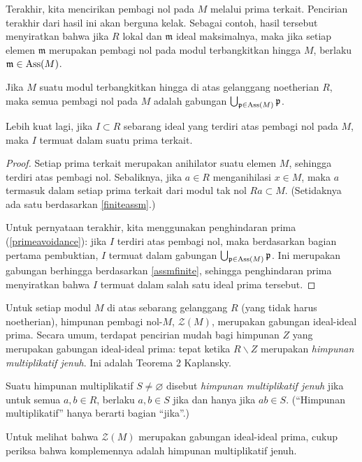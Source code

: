 Terakhir, kita mencirikan pembagi nol pada $M$ melalui prima terkait.
Pencirian terakhir dari hasil ini akan berguna kelak.
Sebagai contoh, hasil tersebut menyiratkan bahwa jika $R$ lokal dan $\mathfrak{m}$ ideal
maksimalnya, maka jika setiap elemen $\mathfrak{m}$ merupakan pembagi nol pada modul
terbangkitkan hingga
$M$, berlaku $\mathfrak{m} \in \operatorname{Ass}(M)$.

\begin{proposition} \label{assmdichotomy}
Jika $M$ suatu modul terbangkitkan hingga di atas gelanggang noetherian $R$, maka semua
pembagi nol pada $M$ adalah gabungan $\bigcup_{\mathfrak{p} \in \operatorname{Ass}(M)}
\mathfrak{p}$.

Lebih kuat lagi, jika $I \subset R$ sebarang ideal yang terdiri atas pembagi nol pada
$M$, maka $I$ termuat dalam suatu prima terkait.
\end{proposition} 
\begin{proof} 
Setiap prima terkait merupakan anihilator suatu elemen $M$, sehingga terdiri
atas pembagi nol. Sebaliknya, jika $a \in R$ menganihilasi $x \in M$, maka $a$
termasuk dalam setiap prima terkait dari modul tak nol $Ra \subset M$. (Setidaknya
ada satu berdasarkan \cref{finiteassm}.)

Untuk pernyataan terakhir, kita menggunakan penghindaran prima (\cref{primeavoidance}): jika $I$ terdiri atas
pembagi nol, maka berdasarkan bagian pertama pembuktian, $I$ termuat dalam gabungan $\bigcup_{\mathfrak{p} \in \operatorname{Ass}(M)}
\mathfrak{p}$. Ini merupakan gabungan berhingga berdasarkan
\cref{assmfinite}, sehingga penghindaran prima menyiratkan bahwa $I$ termuat dalam salah satu
ideal prima tersebut.
\end{proof} 


\begin{exercise} 
Untuk setiap modul $M$ di atas sebarang gelanggang $R$ (yang tidak harus noetherian),
himpunan pembagi nol-$M$, $\mathcal{Z}(M)$, merupakan gabungan ideal-ideal prima. Secara umum, terdapat
 pencirian mudah bagi himpunan $Z$ yang merupakan gabungan ideal-ideal prima: tepat ketika
 $R\smallsetminus Z$ merupakan \emph{himpunan multiplikatif jenuh}. Ini adalah
 Teorema 2 Kaplansky.
 \begin{definition}
   Suatu himpunan multiplikatif $S\neq \varnothing$ disebut \emph{himpunan multiplikatif jenuh} jika
   untuk semua $a,b\in R$, berlaku $a,b\in S$ jika dan hanya jika $ab\in S$. (“Himpunan multiplikatif” hanya
   berarti bagian “jika”.)
 \end{definition}
 Untuk melihat bahwa $\mathcal{Z}(M)$ merupakan gabungan ideal-ideal prima, cukup periksa bahwa komplemennya adalah
 himpunan multiplikatif jenuh.
\end{exercise}


